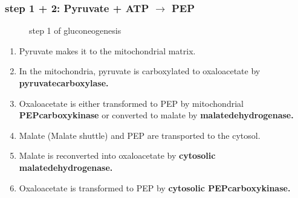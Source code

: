 \documentclass[../main.tex]{subfiles}
\begin{document}
\subsubsection{step 1 + 2: Pyruvate + ATP $\rightarrow$ PEP}

\begin{figure}[H]
	\centering

	\caption{step 1 of gluconeogenesis}
\end{figure}


\begin{enumerate}
    \item Pyruvate makes it to the mitochondrial matrix.
    \item In the mitochondria, pyruvate is carboxylated to oxaloacetate by \textbf{\gls{pyruvatecarboxylase}.}
    \item Oxaloacetate is either transformed to PEP by mitochondrial \textbf{\gls{PEPcarboxykinase} }or converted to malate by \textbf{\gls{malatedehydrogenase}.}
    \item Malate (Malate shuttle) and PEP are transported to the cytosol.
    \item Malate is reconverted into oxaloacetate by \textbf{cytosolic \gls{malatedehydrogenase}.}
    \item Oxaloacetate is transformed to PEP by \textbf{cytosolic \gls{PEPcarboxykinase}.}
\end{enumerate}
\end{document}
